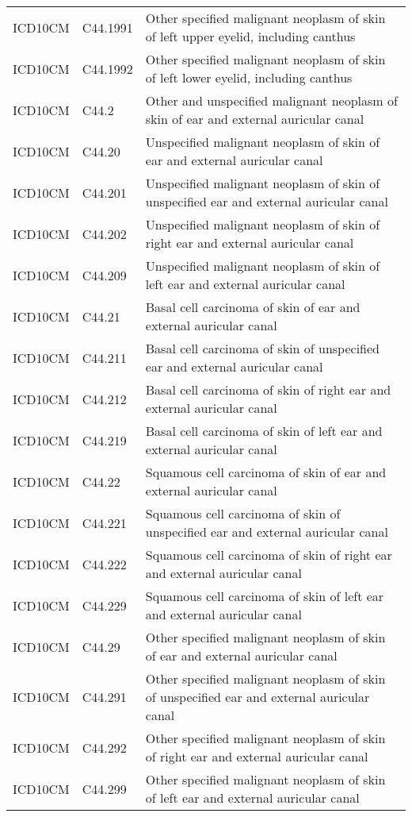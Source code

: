 \begin{table}[ht]
\begin{tabular}{lll}
  ICD10CM & C44.1991 & Other specified malignant neoplasm of skin of left upper eyelid, including canthus \\ 
  ICD10CM & C44.1992 & Other specified malignant neoplasm of skin of left lower eyelid, including canthus \\ 
  ICD10CM & C44.2 & Other and unspecified malignant neoplasm of skin of ear and external auricular canal \\ 
  ICD10CM & C44.20 & Unspecified malignant neoplasm of skin of ear and external auricular canal \\ 
  ICD10CM & C44.201 & Unspecified malignant neoplasm of skin of unspecified ear and external auricular canal \\ 
  ICD10CM & C44.202 & Unspecified malignant neoplasm of skin of right ear and external auricular canal \\ 
  ICD10CM & C44.209 & Unspecified malignant neoplasm of skin of left ear and external auricular canal \\ 
  ICD10CM & C44.21 & Basal cell carcinoma of skin of ear and external auricular canal \\ 
  ICD10CM & C44.211 & Basal cell carcinoma of skin of unspecified ear and external auricular canal \\ 
  ICD10CM & C44.212 & Basal cell carcinoma of skin of right ear and external auricular canal \\ 
  ICD10CM & C44.219 & Basal cell carcinoma of skin of left ear and external auricular canal \\ 
  ICD10CM & C44.22 & Squamous cell carcinoma of skin of ear and external auricular canal \\ 
  ICD10CM & C44.221 & Squamous cell carcinoma of skin of unspecified ear and external auricular canal \\ 
  ICD10CM & C44.222 & Squamous cell carcinoma of skin of right ear and external auricular canal \\ 
  ICD10CM & C44.229 & Squamous cell carcinoma of skin of left ear and external auricular canal \\ 
  ICD10CM & C44.29 & Other specified malignant neoplasm of skin of ear and external auricular canal \\ 
  ICD10CM & C44.291 & Other specified malignant neoplasm of skin of unspecified ear and external auricular canal \\ 
  ICD10CM & C44.292 & Other specified malignant neoplasm of skin of right ear and external auricular canal \\ 
  ICD10CM & C44.299 & Other specified malignant neoplasm of skin of left ear and external auricular canal \\ 

\end{tabular}
\end{table}
